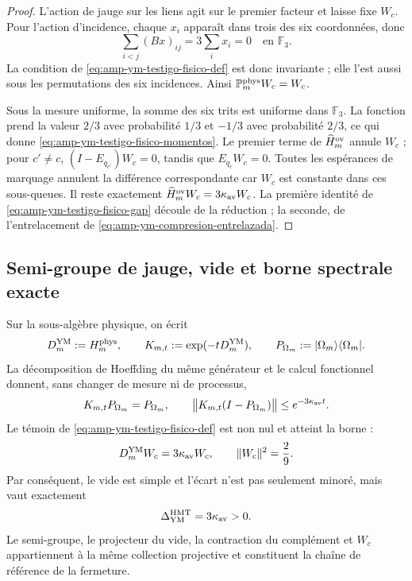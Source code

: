 \begin{proof}
L’action de jauge sur les liens agit sur le premier facteur et laisse fixe
\(W_c\). Pour l’action d’incidence, chaque \(x_i\) apparaît dans trois des
six coordonnées, donc
\[
 \sum_{i<j}(Bx)_{ij}=3\sum_i x_i=0
 \quad\text{en }\mathbb F_3.
\]
La condition de \eqref{eq:amp-ym-testigo-fisico-def} est donc
invariante ; elle l’est aussi sous les permutations des six incidences.
Ainsi \(\mathbb P_m^{\rm phys}W_c=W_c\).

Sous la mesure uniforme, la somme des six trits est uniforme dans \(\mathbb F_3\). La fonction prend la valeur \(2/3\) avec probabilité \(1/3\) et \(-1/3\) avec probabilité \(2/3\), ce qui donne \eqref{eq:amp-ym-testigo-fisico-momentos}. Le premier terme de \(\widehat H_m^{\rm ov}\) annule \(W_c\) ; pour \(c'\ne c\), \((I-E_{q_{c'}})W_c=0\), tandis que \(E_{q_c}W_c=0\). Toutes les espérances de marquage annulent la différence correspondante car \(W_c\) est constante dans ces sous-queues. Il reste exactement \(\widehat H_m^{\rm ov}W_c=3\kappa_{\rm av}W_c\). La première identité de \eqref{eq:amp-ym-testigo-fisico-gap} découle de la réduction ; la seconde, de l'entrelacement de \eqref{eq:amp-ym-compresion-entrelazada}.
\end{proof}

\subsection*{Semi-groupe de jauge, vide et borne spectrale exacte}

Sur la sous-algèbre physique, on écrit
\[
 D_m^{\rm YM}:=H_m^{\rm phys},\qquad
 K_{m,t}:=\exp(-tD_m^{\rm YM}),\qquad
 P_{\Omega_m}:=|\Omega_m\rangle\langle\Omega_m|.
\]
La décomposition de Hoeffding du même générateur et le calcul fonctionnel
donnent, sans changer de mesure ni de processus,
\begin{equation}\label{eq:amp-ym-owner-semigrupo-vacio}
 K_{m,t}P_{\Omega_m}=P_{\Omega_m},
 \qquad
 \bigl\|K_{m,t}(I-P_{\Omega_m})\bigr\|
 \leq e^{-3\kappa_{\rm av}t}.
\end{equation}
Le témoin de \eqref{eq:amp-ym-testigo-fisico-def} est non nul et atteint la
borne :
\begin{equation}\label{eq:amp-ym-owner-testigo-wc}
 D_m^{\rm YM}W_c=3\kappa_{\rm av}W_c,
 \qquad \|W_c\|^2=\frac29.
\end{equation}
Par conséquent, le vide est simple et l’écart n’est pas seulement minoré,
mais vaut exactement
\begin{equation}\label{eq:amp-ym-owner-brecha-exacta}
 \Delta_{\rm YM}^{\rm HMT}=3\kappa_{\rm av}>0.
\end{equation}
Le semi-groupe, le projecteur du vide, la contraction du complément et \(W_c\) appartiennent à la même collection projective et constituent la chaîne de référence de la fermeture.

